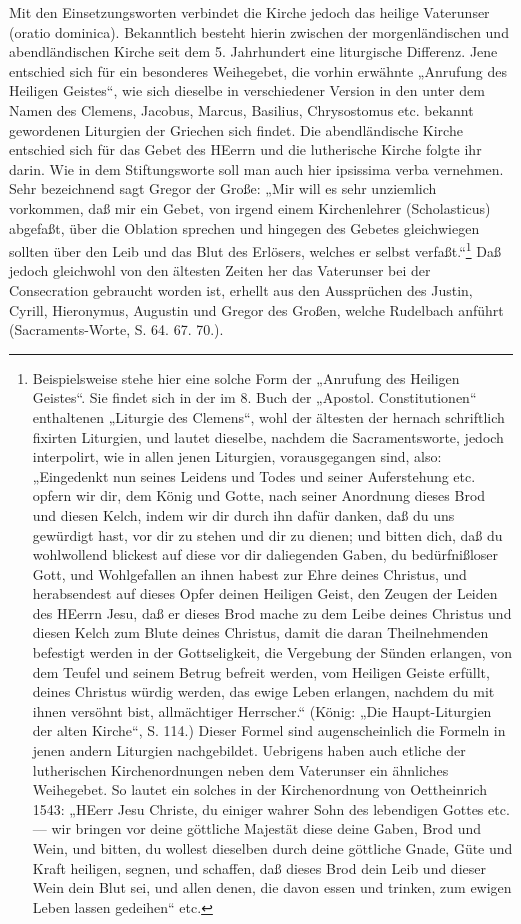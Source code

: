 Mit den Einsetzungsworten verbindet die Kirche jedoch das heilige Vaterunser (oratio dominica). Bekanntlich besteht hierin zwischen der morgenländischen und abendländischen Kirche seit dem 5. Jahrhundert eine liturgische Differenz. Jene entschied sich für ein besonderes Weihegebet, die vorhin erwähnte „Anrufung des Heiligen Geistes“, wie sich dieselbe in verschiedener Version in den unter dem Namen des Clemens, Jacobus, Marcus, Basilius, Chrysostomus etc. bekannt gewordenen Liturgien der Griechen sich findet. Die abendländische Kirche entschied sich für das Gebet des HEerrn und die lutherische Kirche folgte ihr darin. Wie in dem Stiftungsworte soll man auch hier ipsissima verba vernehmen. Sehr bezeichnend sagt Gregor der Große: „Mir will es sehr unziemlich vorkommen, daß mir ein Gebet, von irgend einem Kirchenlehrer (Scholasticus) abgefaßt, über die Oblation sprechen und hingegen des Gebetes gleichwiegen sollten über den Leib und das Blut des Erlösers, welches er selbst verfaßt.“\footnote{Beispielsweise stehe hier eine solche Form der „Anrufung des Heiligen Geistes“. Sie findet sich in der im 8. Buch der „Apostol. Constitutionen“ enthaltenen „Liturgie des Clemens“, wohl der ältesten der hernach schriftlich fixirten Liturgien, und lautet dieselbe, nachdem die Sacramentsworte, jedoch interpolirt, wie in allen jenen Liturgien, vorausgegangen sind, also: „Eingedenkt nun seines Leidens und Todes und seiner Auferstehung etc. opfern wir dir, dem König und Gotte, nach seiner Anordnung dieses Brod und diesen Kelch, indem wir dir durch ihn dafür danken, daß du uns gewürdigt hast, vor dir zu stehen und dir zu dienen; und bitten dich, daß du wohlwollend blickest auf diese vor dir daliegenden Gaben, du bedürfnißloser Gott, und Wohlgefallen an ihnen habest zur Ehre deines Christus, und herabsendest auf dieses Opfer deinen Heiligen Geist, den Zeugen der Leiden des HEerrn Jesu, daß er dieses Brod mache zu dem Leibe deines Christus und diesen Kelch zum Blute deines Christus, damit die daran Theilnehmenden befestigt werden in der Gottseligkeit, die Vergebung der Sünden erlangen, von dem Teufel und seinem Betrug befreit werden, vom Heiligen Geiste erfüllt, deines Christus würdig werden, das ewige Leben erlangen, nachdem du mit ihnen versöhnt bist, allmächtiger Herrscher.“ (König: „Die Haupt-Liturgien der alten Kirche“, S. 114.) Dieser Formel sind augenscheinlich die Formeln in jenen andern Liturgien nachgebildet. Uebrigens haben auch etliche der lutherischen Kirchenordnungen neben dem Vaterunser ein ähnliches Weihegebet. So lautet ein solches in der Kirchenordnung von Oettheinrich 1543: „HEerr Jesu Christe, du einiger wahrer Sohn des lebendigen Gottes etc. — wir bringen vor deine göttliche Majestät diese deine Gaben, Brod und Wein, und bitten, du wollest dieselben durch deine göttliche Gnade, Güte und Kraft heiligen, segnen, und schaffen, daß dieses Brod dein Leib und dieser Wein dein Blut sei, und allen denen, die davon essen und trinken, zum ewigen Leben lassen gedeihen“ etc.} Daß jedoch gleichwohl von den ältesten Zeiten her das Vaterunser bei der Consecration gebraucht worden ist, erhellt aus den Aussprüchen des Justin, Cyrill, Hieronymus, Augustin und Gregor des Großen, welche Rudelbach anführt (Sacraments-Worte, S. 64. 67. 70.).

